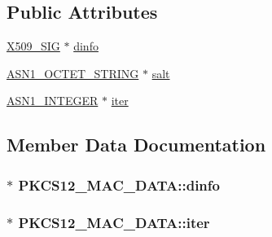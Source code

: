 \subsection*{Public Attributes}
\begin{DoxyCompactItemize}
\item 
\hyperlink{x509_8h_a84b39cf74cc1ae6512f7d4481f5f4404}{X509\+\_\+\+S\+IG} $\ast$ \hyperlink{struct_p_k_c_s12___m_a_c___d_a_t_a_af1f129d63901a78afc5efe5b7e20ceff}{dinfo}
\item 
\hyperlink{ossl__typ_8h_afbd05e94e0f0430a2b729473efec88c1}{A\+S\+N1\+\_\+\+O\+C\+T\+E\+T\+\_\+\+S\+T\+R\+I\+NG} $\ast$ \hyperlink{struct_p_k_c_s12___m_a_c___d_a_t_a_aa20b01b05e8dc10b03a8f49a1c683559}{salt}
\item 
\hyperlink{ossl__typ_8h_af4335399bf9774cb410a5e93de65998b}{A\+S\+N1\+\_\+\+I\+N\+T\+E\+G\+ER} $\ast$ \hyperlink{struct_p_k_c_s12___m_a_c___d_a_t_a_a7c5060546ea3ebee4d8bf1b087f6e567}{iter}
\end{DoxyCompactItemize}


\subsection{Member Data Documentation}
\subsubsection[{\texorpdfstring{dinfo}{dinfo}}]{$\ast$ P\+K\+C\+S12\+\_\+\+M\+A\+C\+\_\+\+D\+A\+T\+A\+::dinfo}\hypertarget{struct_p_k_c_s12___m_a_c___d_a_t_a_af1f129d63901a78afc5efe5b7e20ceff}{}\label{struct_p_k_c_s12___m_a_c___d_a_t_a_af1f129d63901a78afc5efe5b7e20ceff}
\subsubsection[{\texorpdfstring{iter}{iter}}]{$\ast$ P\+K\+C\+S12\+\_\+\+M\+A\+C\+\_\+\+D\+A\+T\+A\+::iter}\hypertarget{struct_p_k_c_s12___m_a_c___d_a_t_a_a7c5060546ea3ebee4d8bf1b087f6e567}{}\label{struct_p_k_c_s12___m_a_c___d_a_t_a_a7c5060546ea3ebee4d8bf1b087f6e567}
